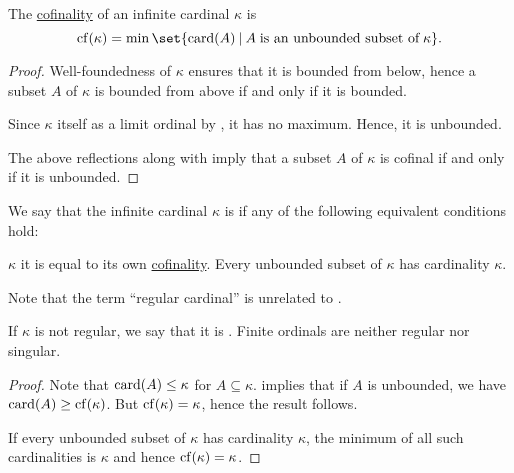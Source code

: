\begin{proposition}\label{thm:cardinal_cofinality}
  The \hyperref[def:cofinality]{cofinality} of an infinite cardinal \( \kappa \) is
  \begin{equation*}
    \op{cf}(\kappa) = \min\set{ \card(A) \given A \T{is an unbounded subset of} \kappa }.
  \end{equation*}
\end{proposition}
\begin{proof}
  Well-foundedness of \( \kappa \) ensures that it is bounded from below, hence a subset \( A \) of \( \kappa \) is bounded from above if and only if it is bounded.

  Since \( \kappa \) itself as a limit ordinal by , it has no maximum. Hence, it is unbounded.

  The above reflections along with  imply that a subset \( A \) of \( \kappa \) is cofinal if and only if it is unbounded.
\end{proof}

\begin{definition}\label{def:regular_cardinal}
  We say that the infinite cardinal \( \kappa \) is  if any of the following equivalent conditions hold:
  \begin{thmenum}
     \( \kappa \) it is equal to its own \hyperref[def:cofinality]{cofinality}.
     Every unbounded subset of \( \kappa \) has cardinality \( \kappa \).
  \end{thmenum}

  Note that the term \enquote{regular cardinal} is unrelated to .

  If \( \kappa \) is not regular, we say that it is . Finite ordinals are neither regular nor singular.
\end{definition}
\begin{proof}
   Note that \( \operatorname{card}(A) \leq \kappa \) for \( A \subseteq \kappa \).  implies that if \( A \) is unbounded, we have \( \operatorname{card}(A) \geq \operatorname{cf}(\kappa) \). But \( \operatorname{cf}(\kappa) = \kappa \), hence the result follows.

   If every unbounded subset of \( \kappa \) has cardinality \( \kappa \), the minimum of all such cardinalities is \( \kappa \) and hence \( \operatorname{cf}(\kappa) = \kappa \).
\end{proof}

